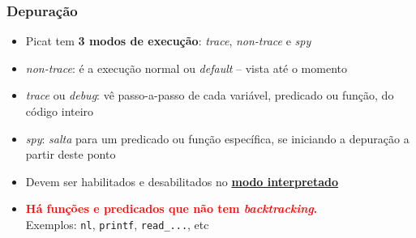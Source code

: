 \begin{frame}[fragile]

    \frametitle{Depuração}

    \begin{itemize}
    
      \item Picat tem \textbf{3 modos de execução}: \textit{trace},
      \textit{non-trace} e \textit{spy}
      \pause
      \item  \textit{non-trace}: é a execução normal ou \textit{default} -- vista até o momento

      \pause
      \item  \textit{trace} ou \textit{debug}: vê passo-a-passo de cada variável, predicado ou      função,  do código inteiro
      \pause
      \item \textit{spy}: \textit{salta} para um predicado ou função específica,
       se iniciando a depuração a partir deste ponto

      \pause
      \item Devem ser habilitados e desabilitados no \underline{\textbf{modo interpretado}}
    
      \item \textbf{\textcolor{red}{Há funções e predicados que não tem \textit{backtracking}.}}\\
      \pause
       Exemplos: \texttt{nl}, \texttt{printf}, \texttt{read\_...}, etc
       
    \end{itemize}
\end{frame}


